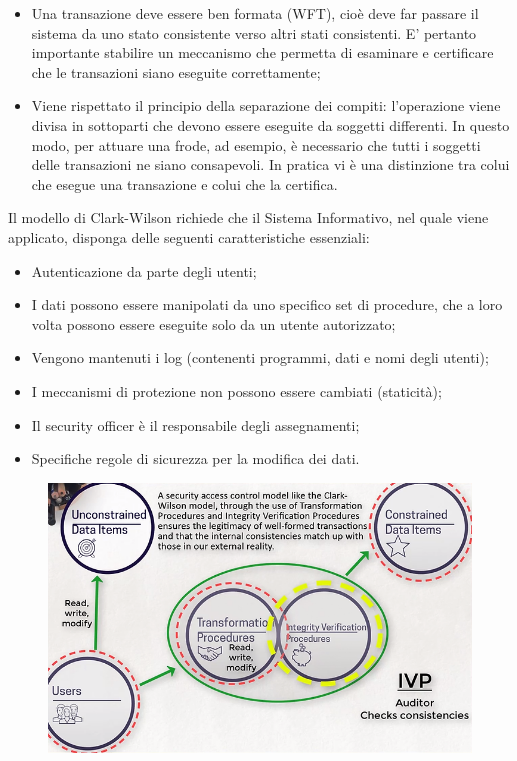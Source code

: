 \begin{itemize}
      \item Una transazione deve essere ben formata (WFT), cioè deve far passare
            il sistema da uno
            stato consistente verso altri stati consistenti. E’ pertanto
            importante stabilire un
            meccanismo che permetta di esaminare e certificare che le transazioni
            siano eseguite
            correttamente;
      \item Viene rispettato il principio della separazione dei compiti:
            l’operazione viene divisa in
            sottoparti che devono essere eseguite da soggetti differenti.
            In questo modo, per attuare
            una frode, ad esempio, è necessario che tutti i soggetti delle
            transazioni ne siano
            consapevoli. In pratica vi è una distinzione tra colui che esegue
            una transazione e colui che
            la certifica.
\end{itemize}

Il modello di Clark-Wilson richiede che il Sistema Informativo, nel quale viene
applicato, disponga
delle seguenti caratteristiche essenziali:

\begin{itemize}
      \item Autenticazione da parte degli utenti;
      \item I dati possono essere manipolati da uno specifico set di procedure,
            che a loro volta
            possono essere eseguite solo da un utente autorizzato;
      \item Vengono mantenuti i log (contenenti programmi, dati e nomi degli
            utenti);
      \item I meccanismi di protezione non possono essere cambiati (staticità);
      \item Il security officer è il responsabile degli assegnamenti;
      \item Specifiche regole di sicurezza per la modifica dei dati.
\end{itemize}

\begin{figure}[H]
      \centering
      \includegraphics[width=12cm, keepaspectratio]{capitoli/policy/imgs/clark_wilson3.png}
\end{figure}

